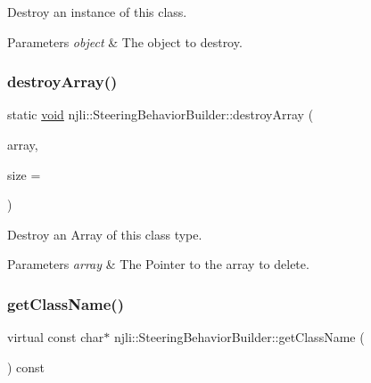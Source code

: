 Destroy an instance of this class.


\begin{DoxyParams}{Parameters}
{\em object} & The object to destroy. \\
\hline
\end{DoxyParams}
\mbox{\label{classnjli_1_1_steering_behavior_builder_aa18561a56f6e028f606423025bbfbc51}} 
\subsubsection{\texorpdfstring{destroy\+Array()}{destroyArray()}}
{\footnotesize\ttfamily static \mbox{\hyperlink{_thread_8h_af1e856da2e658414cb2456cb6f7ebc66}{void}} njli\+::\+Steering\+Behavior\+Builder\+::destroy\+Array (\begin{DoxyParamCaption}\item[{\mbox{\hyperlink{classnjli_1_1_steering_behavior_builder}{Steering\+Behavior\+Builder}} $\ast$$\ast$}]{array,  }\item[{const \mbox{\hyperlink{_util_8h_a10e94b422ef0c20dcdec20d31a1f5049}{u32}}}]{size = {} }\end{DoxyParamCaption})\hspace{0.3cm}{\ttfamily [static]}}

Destroy an Array of this class type.


\begin{DoxyParams}{Parameters}
{\em array} & The Pointer to the array to delete. \\
\hline
\end{DoxyParams}
\mbox{\label{classnjli_1_1_steering_behavior_builder_a647d153d1aa7e81b7e4ee6a2ca55efd1}} 
\subsubsection{\texorpdfstring{get\+Class\+Name()}{getClassName()}}
{\footnotesize\ttfamily virtual const char$\ast$ njli\+::\+Steering\+Behavior\+Builder\+::get\+Class\+Name (\begin{DoxyParamCaption}{ }\end{DoxyParamCaption}) const\hspace{0.3cm}{\ttfamily [virtual]}}

